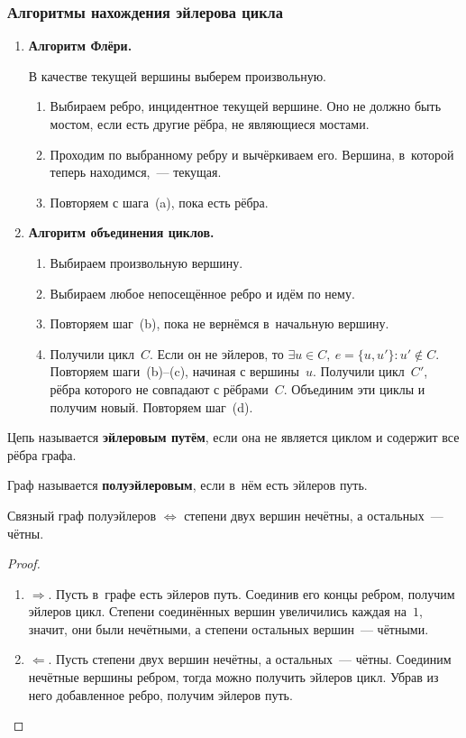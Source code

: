 \subsubsection{Алгоритмы нахождения эйлерова цикла}
\begin{enumerate}
	\item{}\textbf{Алгоритм Флёри.}
	
	В качестве текущей вершины выберем произвольную.
	\begin{enumerate}
		\item Выбираем ребро, инцидентное текущей вершине.
		Оно не должно быть мостом, если есть другие рёбра, не являющиеся мостами.
		\item Проходим по выбранному ребру и вычёркиваем его.
		Вершина, в~которой теперь находимся,~--- текущая.
		\item Повторяем с шага~(a), пока есть рёбра.
	\end{enumerate}
	
	\item{}\textbf{Алгоритм объединения циклов.}
	\begin{enumerate}
		\item Выбираем произвольную вершину.
		\item Выбираем любое непосещённое ребро и идём по нему.
		\item Повторяем шаг~(b), пока не вернёмся в~начальную вершину.
		\item Получили цикл~$C$.
		Если он не эйлеров, то $\exists u \in C, \ e = \{ u, u' \} \colon u' \notin C$.
		Повторяем шаги~(b)\nobreakdash--(c), начиная с вершины~$u$.
		Получили цикл~$C'$, рёбра которого не совпадают с рёбрами~$C$.
		Объединим эти циклы и получим новый.
		Повторяем шаг~(d).
	\end{enumerate}
\end{enumerate}

Цепь называется \textbf{эйлеровым путём}, если она не является циклом и содержит все рёбра графа.

 Граф называется \textbf{полуэйлеровым}, если в~нём есть эйлеров путь.

\begin{theorem}
Связный граф полуэйлеров $\Leftrightarrow$ степени двух вершин нечётны, а остальных~--- чётны.
\end{theorem}
\begin{proof}
\begin{enumerate}
	\item $\Rightarrow$. Пусть в~графе есть эйлеров путь.
	Соединив его концы ребром, получим эйлеров цикл.
	Степени соединённых вершин увеличились каждая на~$1$, значит, они были нечётными, а степени остальных вершин~--- чётными.
	\item $\Leftarrow$. Пусть степени двух вершин нечётны, а остальных~--- чётны.
	Соединим нечётные вершины ребром, тогда можно получить эйлеров цикл.
	Убрав из него добавленное ребро, получим эйлеров путь.
\end{enumerate}
\end{proof}
